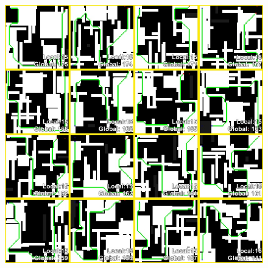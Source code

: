 \begin{figure}[htb]
	\begin{center}
		\includegraphics[width=1\textwidth]{Imagens/maps_melotti.jpg}
	\end{center}
\end{figure}

\FloatBarrier